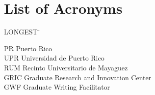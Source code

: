 

\chapter*{List of Acronyms}

 \noindent
\vspace{-1.75\baselineskip}
  \begin{tabbing}
LONGEST \=  \kill %

PR \> Puerto Rico\\
UPR \> Universidad de Puerto Rico\\ %
RUM \> Recinto Universitario de Mayaguez\\
GRIC \> Graduate Research and Innovation Center\\
GWF \> Graduate Writing Facilitator\\



\end{tabbing}